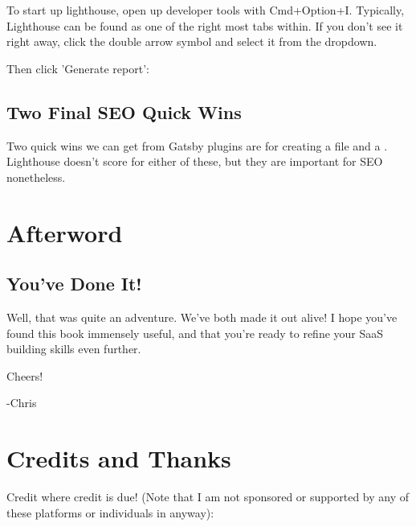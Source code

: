 \documentclass[paper=6in:9in,pagesize=pdftex,headinclude=on,footinclude=on,12pt,twoside]{scrbook}
\begin{document}
To start up lighthouse, open up developer tools with Cmd+Option+I. Typically, Lighthouse can be found as one of the right most tabs within. If you don't see it right away, click the double arrow symbol and select it from the dropdown.

Then click 'Generate report':


\section{Two Final SEO Quick Wins}

Two quick wins we can get from Gatsby plugins are for creating a  file and a . Lighthouse doesn't score for either of these, but they are important for SEO nonetheless.

\chapter*{Afterword}

\section*{You've Done It!}

Well, that was quite an adventure. We've both made it out alive! I hope you've found this book immensely useful, and that you're ready to refine your SaaS building skills even further.

Cheers! \beers

-Chris

\chapter*{Credits and Thanks}

Credit where credit is due! (Note that I am not sponsored or supported by any of these platforms or individuals in anyway):
\end{document}
